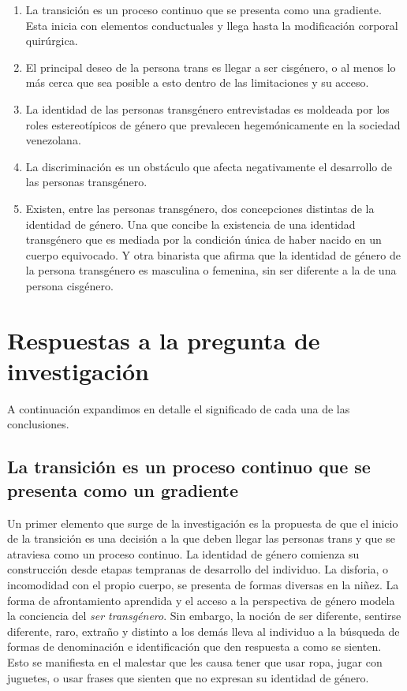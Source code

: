 \begin{enumerate}

  \item La transición es un proceso continuo que se presenta como una gradiente.
  Esta inicia con elementos conductuales y llega hasta la modificación corporal
  quirúrgica.

  \item El principal deseo de la persona trans es llegar a ser cisgénero, o al
  menos lo más cerca que sea posible a esto dentro de las limitaciones y su
  acceso.

  \item La identidad de las personas transgénero entrevistadas es moldeada por los
  roles estereotípicos de género que prevalecen hegemónicamente en la sociedad
  venezolana.

  \item La discriminación es un obstáculo que afecta negativamente el desarrollo
  de las personas transgénero.

  \item Existen, entre las personas transgénero, dos concepciones distintas de
  la identidad de género. Una que concibe la existencia de una identidad
  transgénero que es mediada por la condición única de haber nacido en un
  cuerpo equivocado. Y otra binarista que afirma que la identidad de género de
  la persona transgénero es masculina o femenina, sin ser diferente a la de una
  persona cisgénero.

\end{enumerate}

\section{Respuestas a la pregunta de investigación}


A continuación expandimos en detalle el significado de cada una de las
conclusiones.

\subsection[La transición es un proceso continuo]{La transición es un proceso continuo que se presenta como un gradiente}

Un primer elemento que surge de la investigación es la propuesta de que el
inicio de la transición es una decisión a la que deben llegar las personas trans
y que se atraviesa como un proceso continuo. La identidad de género comienza su
construcción desde etapas tempranas de desarrollo del individuo. La disforia, o
incomodidad con el propio cuerpo, se presenta de formas diversas en la niñez. La
forma de afrontamiento aprendida y el acceso a la perspectiva de género modela
la conciencia del \emph{ser transgénero}. Sin embargo, la noción de ser
diferente, sentirse diferente, raro, extraño y distinto a los demás lleva al
individuo a la búsqueda de formas de denominación e identificación que den
respuesta a como se sienten. Esto se manifiesta en el malestar que les causa
tener que usar ropa, jugar con juguetes, o usar frases que sienten que no expresan
su identidad de género.

